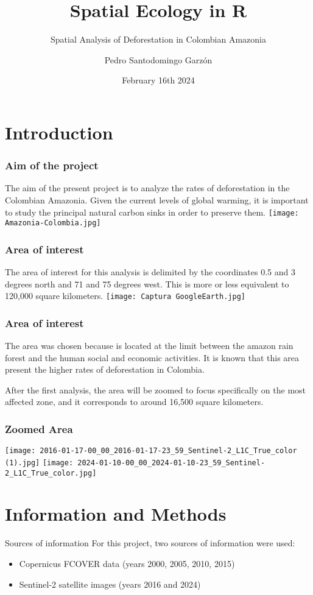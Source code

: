 \documentclass{beamer}
\title{Spatial Ecology in R}
\subtitle{Spatial Analysis of Deforestation in Colombian Amazonia}
\author{Pedro Santodomingo Garzón}
\institute{Alma Mater Studiorum UniBo}
\date{February 16th 2024}
\begin{document}
\maketitle


\section{Introduction}
\begin{frame}
\frametitle{Aim of the project}
The aim of the present project is to analyze the rates of deforestation in the Colombian Amazonia. Given the current levels of global warming, it is important to study the principal natural carbon sinks in order to preserve them. 
\centering
\texttt{[image: Amazonia-Colombia.jpg]}
\end{frame}

\begin{frame}
\frametitle{Area of interest}
\centering
The area of interest for this analysis is delimited by the coordinates 0.5 and 3 degrees north and 71 and 75 degrees west. This is more or less equivalent to 120,000 square kilometers.
\texttt{[image: Captura GoogleEarth.jpg]}
\end{frame}

\begin{frame}
\frametitle{Area of interest}
\centering
The area was chosen because is located at the limit between the amazon rain forest and the human social and economic activities. It is known that this area present the higher rates of deforestation in Colombia.

\bigskip

After the first analysis, the area will be zoomed to focus specifically on the most affected zone, and it corresponds to around 16,500 square kilometers. 
\end{frame}

\begin{frame}
\frametitle{Zoomed Area}
\centering
\texttt{[image: 2016-01-17-00\_00\_2016-01-17-23\_59\_Sentinel-2\_L1C\_True\_color (1).jpg]}
\texttt{[image: 2024-01-10-00\_00\_2024-01-10-23\_59\_Sentinel-2\_L1C\_True\_color.jpg]}
\end{frame}

\section{Information and Methods}
\begin{frame}{Sources of information}
For this project, two sources of information were used:
\begin{itemize}
  \item Copernicus FCOVER data (years 2000, 2005, 2010, 2015)
  \item Sentinel-2 satellite images (years 2016 and 2024)
 \end{itemize}
\end{frame}
\end{document}
